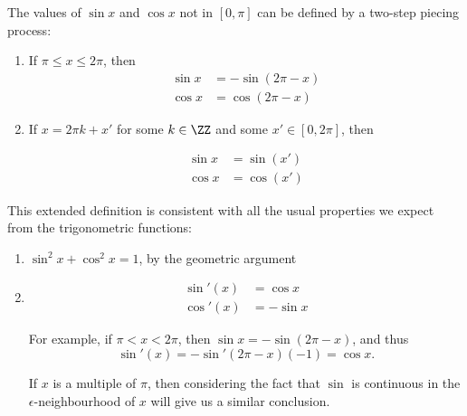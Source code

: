 \documentclass[11pt]{scrartcl}
\begin{document}
The values of $\sin x$ and $\cos x$ not in $[0, \pi]$ can be defined
by a two-step piecing process:

\begin{enumerate}
\item\label{item:1} If $\pi\leq x\leq 2\pi$, then
  \begin{align}
    \sin x &= - \sin(2\pi - x)\\
    \cos x &= \cos(2\pi - x)
  \end{align}
\item If $ x = 2\pi k + x'$ for some $k\in \ZZ$ and some
  $x'\in [0,2\pi]$, then

  \begin{align}
    \sin x &= \sin(x')\\
    \cos x &= \cos(x')
  \end{align}
\end{enumerate}

This extended definition is consistent with all the usual properties
we expect from the trigonometric functions:

\begin{enumerate}
\item\label{item:2} $\sin^2x + \cos^2x  = 1$, by the geometric argument
\item \begin{align}
        \sin'(x) &= \cos x\\
        \cos'(x) &= -\sin x
      \end{align}

      For example, if $\pi < x < 2\pi$, then
      $\sin x = -\sin (2\pi - x)$, and thus \[\sin'(x) = -\sin'(2\pi - x)(-1) = \cos x.\]

      If $x$ is a multiple of $\pi$, then considering the fact that
      $\sin$ is continuous in the $\epsilon$-neighbourhood of $x$ will
      give us a similar conclusion.
    \end{enumerate}
\end{document}
